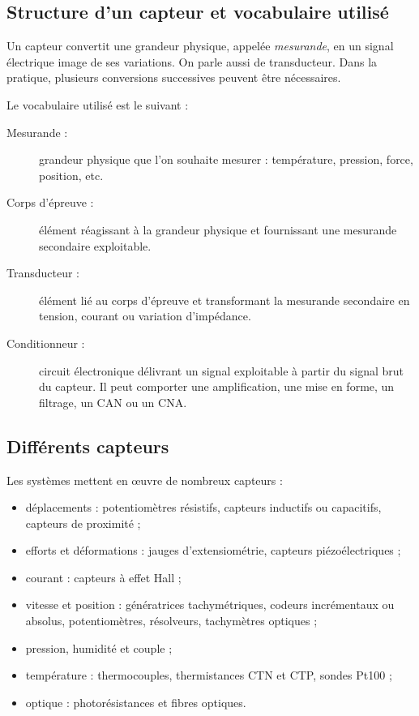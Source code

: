 \subsection{Structure d'un capteur et vocabulaire utilisé}

Un capteur convertit une grandeur physique, appelée \emph{mesurande}, en un signal électrique image de ses variations. On parle aussi de transducteur. Dans la pratique, plusieurs conversions successives peuvent être nécessaires.

Le vocabulaire utilisé est le suivant :
\begin{description}
  \item[Mesurande :] grandeur physique que l'on souhaite mesurer : température, pression, force, position, etc.
  \item[Corps d'épreuve :] élément réagissant à la grandeur physique et fournissant une mesurande secondaire exploitable.
  \item[Transducteur :] élément lié au corps d'épreuve et transformant la mesurande secondaire en tension, courant ou variation d'impédance.
  \item[Conditionneur :] circuit électronique délivrant un signal exploitable à partir du signal brut du capteur. Il peut comporter une amplification, une mise en forme, un filtrage, un CAN ou un CNA.
\end{description}

\subsection{Différents capteurs}

Les systèmes mettent en œuvre de nombreux capteurs :
\begin{itemize}
  \item déplacements : potentiomètres résistifs, capteurs inductifs ou capacitifs, capteurs de proximité ;
  \item efforts et déformations : jauges d'extensiométrie, capteurs piézoélectriques ;
  \item courant : capteurs à effet Hall ;
  \item vitesse et position : génératrices tachymétriques, codeurs incrémentaux ou absolus, potentiomètres, résolveurs, tachymètres optiques ;
  \item pression, humidité et couple ;
  \item température : thermocouples, thermistances CTN et CTP, sondes Pt100 ;
  \item optique : photorésistances et fibres optiques.
\end{itemize}

